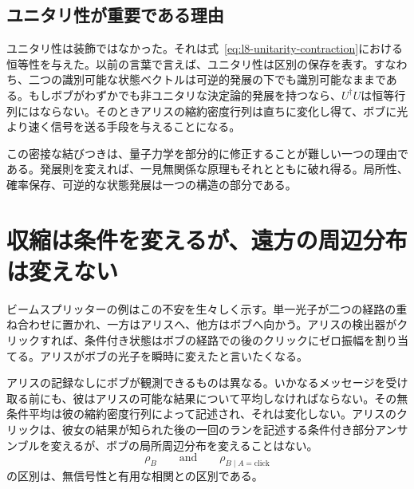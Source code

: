 \begin{classroomqa}
\end{classroomqa}

\subsection{ユニタリ性が重要である理由}

ユニタリ性は装飾ではなかった。それは式~\eqref{eq:l8-unitarity-contraction}における恒等性を与えた。以前の言葉で言えば、ユニタリ性は区別の保存を表す。すなわち、二つの識別可能な状態ベクトルは可逆的発展の下でも識別可能なままである。もしボブがわずかでも非ユニタリな決定論的発展を持つなら、\(U^\dagger U\)は恒等行列にはならない。そのときアリスの縮約密度行列は直ちに変化し得て、ボブに光より速く信号を送る手段を与えることになる。

この密接な結びつきは、量子力学を部分的に修正することが難しい一つの理由である。発展則を変えれば、一見無関係な原理もそれとともに破れ得る。局所性、確率保存、可逆的な状態発展は一つの構造の部分である。

\begin{classroomqa}
\end{classroomqa}

\section{収縮は条件を変えるが、遠方の周辺分布は変えない}

ビームスプリッターの例はこの不安を生々しく示す。単一光子が二つの経路の重ね合わせに置かれ、一方はアリスへ、他方はボブへ向かう。アリスの検出器がクリックすれば、条件付き状態はボブの経路での後のクリックにゼロ振幅を割り当てる。アリスがボブの光子を瞬時に変えたと言いたくなる。

アリスの記録なしにボブが観測できるものは異なる。いかなるメッセージを受け取る前にも、彼はアリスの可能な結果について平均しなければならない。その無条件平均は彼の縮約密度行列によって記述され、それは変化しない。アリスのクリックは、彼女の結果が知られた後の一回のランを記述する条件付き部分アンサンブルを変えるが、ボブの局所周辺分布を変えることはない。
\begin{equation}
\rho_B
\qquad\text{and}\qquad
\rho_{B\mid A=\text{click}}
\end{equation}
の区別は、無信号性と有用な相関との区別である。

